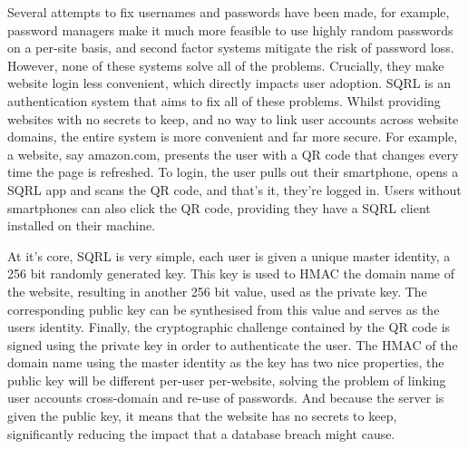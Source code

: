 Several attempts to fix usernames and passwords have been made, for example, password managers make it much more feasible to use highly random passwords on a per-site basis, and second factor systems mitigate the risk of password loss. However, none of these systems solve all of the problems. Crucially, they make website login less convenient, which directly impacts user adoption. SQRL is an authentication system that aims to fix all of these problems. Whilst providing websites with no secrets to keep, and no way to link user accounts across website domains, the entire system is more convenient and far more secure. For example, a website, say amazon.com, presents the user with a QR code that changes every time the page is refreshed. To login, the user pulls out their smartphone, opens a SQRL app and scans the QR code, and that's it, they're logged in. Users without smartphones can also click the QR code, providing they have a SQRL client installed on their machine.

At it's core, SQRL is very simple, each user is given a unique master identity, a 256 bit randomly generated key. This key is used to HMAC the domain name of the website, resulting in another 256 bit value, used as the private key. The corresponding public key can be synthesised from this value and serves as the users identity. Finally, the cryptographic challenge contained by the QR code is signed using the private key in order to authenticate the user. The HMAC of the domain name using the master identity as the key has two nice properties, the public key will be different per-user per-website, solving the problem of linking user accounts cross-domain and re-use of passwords. And because the server is given the public key, it means that the website has no secrets to keep, significantly reducing the impact that a database breach might cause.
